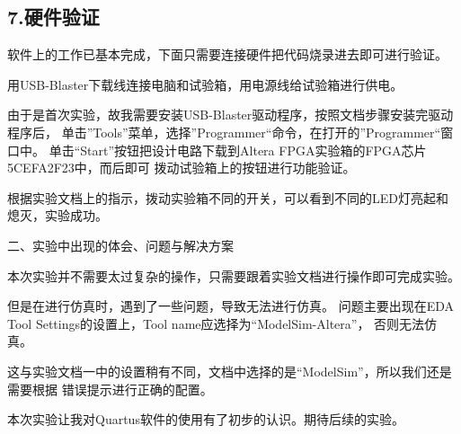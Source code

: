 \documentclass[12pt]{article}
\begin{document}
\subsection*{7.硬件验证}
软件上的工作已基本完成，下面只需要连接硬件把代码烧录进去即可进行验证。

用USB-Blaster下载线连接电脑和试验箱，用电源线给试验箱进行供电。

由于是首次实验，故我需要安装USB-Blaster驱动程序，按照文档步骤安装完驱动程序后，
单击”Tools”菜单，选择”Programmer“命令，在打开的”Programmer“窗口中。
单击“Start”按钮把设计电路下载到Altera FPGA实验箱的FPGA芯片5CEFA2F23中，而后即可
拨动试验箱上的按钮进行功能验证。

根据实验文档上的指示，拨动实验箱不同的开关，可以看到不同的LED灯亮起和熄灭，实验成功。

\begin{highlightedsection}{}
    二、实验中出现的体会、问题与解决方案
\end{highlightedsection}
本次实验并不需要太过复杂的操作，只需要跟着实验文档进行操作即可完成实验。

但是在进行仿真时，遇到了一些问题，导致无法进行仿真。
问题主要出现在EDA Tool Settings的设置上，Tool name应选择为“ModelSim-Altera”，
否则无法仿真。

这与实验文档一中的设置稍有不同，文档中选择的是“ModelSim”，所以我们还是需要根据
错误提示进行正确的配置。

本次实验让我对Quartus软件的使用有了初步的认识。期待后续的实验。
\end{document}
